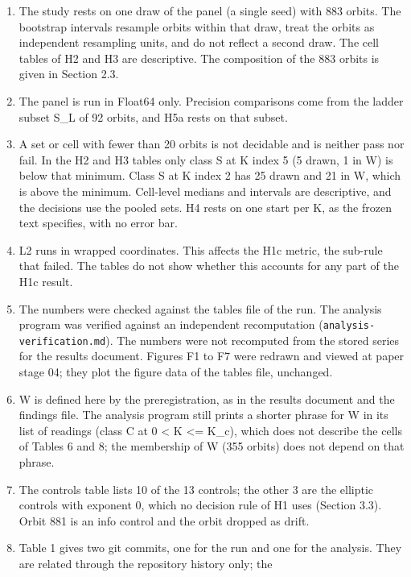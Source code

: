 \documentclass[
  11pt,
]{article}
\providecommand{\tightlist}{%
  \setlength{\itemsep}{0pt}\setlength{\parskip}{0pt}}
\begin{document}
\begin{enumerate}
\def\labelenumi{\arabic{enumi}.}
\tightlist
\item
  The study rests on one draw of the panel (a single seed) with 883
  orbits. The bootstrap intervals resample orbits within that draw,
  treat the orbits as independent resampling units, and do not reflect a
  second draw. The cell tables of H2 and H3 are descriptive. The
  composition of the 883 orbits is given in Section 2.3.
\item
  The panel is run in Float64 only. Precision comparisons come from the
  ladder subset S\_L of 92 orbits, and H5a rests on that subset.
\item
  A set or cell with fewer than 20 orbits is not decidable and is
  neither pass nor fail. In the H2 and H3 tables only class S at K index
  5 (5 drawn, 1 in W) is below that minimum. Class S at K index 2 has 25
  drawn and 21 in W, which is above the minimum. Cell-level medians and
  intervals are descriptive, and the decisions use the pooled sets. H4
  rests on one start per K, as the frozen text specifies, with no error
  bar.
\item
  L2 runs in wrapped coordinates. This affects the H1c metric, the
  sub-rule that failed. The tables do not show whether this accounts for
  any part of the H1c result.
\item
  The numbers were checked against the tables file of the run. The
  analysis program was verified against an independent recomputation
  (\texttt{analysis-verification.md}). The numbers were not recomputed
  from the stored series for the results document. Figures F1 to F7 were
  redrawn and viewed at paper stage 04; they plot the figure data of the
  tables file, unchanged.
\item
  W is defined here by the preregistration, as in the results document
  and the findings file. The analysis program still prints a shorter
  phrase for W in its list of readings (class C at 0 \textless{} K
  \textless= K\_c), which does not describe the cells of Tables 6 and 8;
  the membership of W (355 orbits) does not depend on that phrase.
\item
  The controls table lists 10 of the 13 controls; the other 3 are the
  elliptic controls with exponent 0, which no decision rule of H1 uses
  (Section 3.3). Orbit 881 is an info control and the orbit dropped as
  drift.
\item
  Table 1 gives two git commits, one for the run and one for the
  analysis. They are related through the repository history only; the

\end{enumerate}
\end{document}
